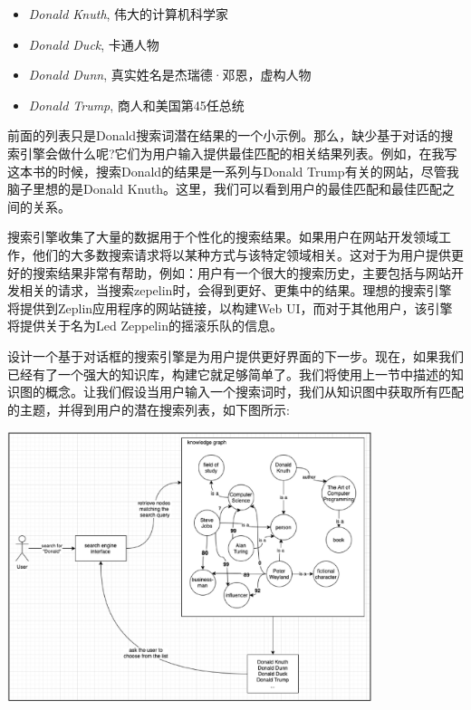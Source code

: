\begin{itemize}
	\item \textit{Donald Knuth}, 伟大的计算机科学家
	\item \textit{Donald Duck}, 卡通人物
	\item \textit{Donald Dunn}, 真实姓名是杰瑞德·邓恩，虚构人物
	\item \textit{Donald Trump}, 商人和美国第45任总统
\end{itemize}

前面的列表只是Donald搜索词潜在结果的一个小示例。那么，缺少基于对话的搜索引擎会做什么呢?它们为用户输入提供最佳匹配的相关结果列表。例如，在我写这本书的时候，搜索Donald的结果是一系列与Donald Trump有关的网站，尽管我脑子里想的是Donald Knuth。这里，我们可以看到用户的最佳匹配和最佳匹配之间的关系。 \par
搜索引擎收集了大量的数据用于个性化的搜索结果。如果用户在网站开发领域工作，他们的大多数搜索请求将以某种方式与该特定领域相关。这对于为用户提供更好的搜索结果非常有帮助，例如：用户有一个很大的搜索历史，主要包括与网站开发相关的请求，当搜索zepelin时，会得到更好、更集中的结果。理想的搜索引擎将提供到Zeplin应用程序的网站链接，以构建Web UI，而对于其他用户，该引擎将提供关于名为Led Zeppelin的摇滚乐队的信息。 \par
设计一个基于对话框的搜索引擎是为用户提供更好界面的下一步。现在，如果我们已经有了一个强大的知识库，构建它就足够简单了。我们将使用上一节中描述的知识图的概念。让我们假设当用户输入一个搜索词时，我们从知识图中获取所有匹配的主题，并得到用户的潜在搜索列表，如下图所示: \par

\begin{center}
	\includegraphics[width=0.8\textwidth]{content/Section-3/Chapter-16/17}
\end{center}

